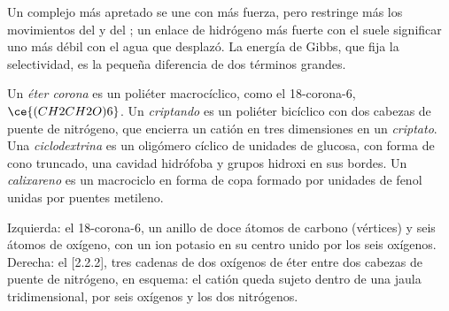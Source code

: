 Un complejo más apretado se une con más fuerza, pero restringe más los movimientos del  y
del ; un enlace de hidrógeno más fuerte con el  suele significar uno más débil con
el agua que desplazó. La energía de Gibbs, que fija la selectividad, es la pequeña
diferencia de dos términos grandes.

\begin{definition}[Anfitriones]\label{def:b3:supramolecular:hosts}
Un \emph{éter corona} es un poliéter macrocíclico, como el
18-corona-6, $\ce{(CH2CH2O)6}$. Un \emph{criptando} es un poliéter
bicíclico con dos cabezas de puente de nitrógeno, que encierra un catión en tres
dimensiones en un \emph{criptato}. Una
\emph{ciclodextrina} es un oligómero cíclico de unidades de glucosa, con
forma de cono truncado, una cavidad hidrófoba y grupos hidroxi en sus
bordes. Un \emph{calixareno} es un macrociclo en forma de copa formado por
unidades de fenol unidas por puentes metileno.
\end{definition}

\begin{omfigure}

{\small Izquierda: el 18-corona-6, un anillo de doce átomos de carbono (vértices) y seis átomos de
oxígeno, con un ion potasio en su centro unido por los seis oxígenos. Derecha: el
[2.2.2], tres cadenas de dos oxígenos de éter entre dos cabezas de puente
de nitrógeno, en esquema: el catión queda sujeto dentro de una jaula tridimensional,
por seis oxígenos y los dos nitrógenos.}
\end{omfigure}

